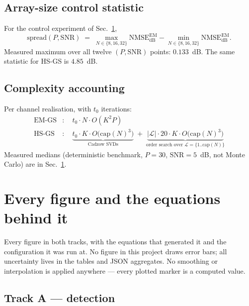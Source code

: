 \documentclass[11pt,a4paper]{article}
\newcommand{\NMSE}{\mathrm{NMSE}}
\newcommand{\SNR}{\mathrm{SNR}}
\newcommand{\dB}{\mathrm{dB}}
\begin{document}
\subsection{Array-size control statistic}
For the control experiment of Sec.~\ref{sec:figures},
\begin{equation}
\mathrm{spread}(P,\SNR) \;=\;
\max_{N\in\{8,16,32\}}\NMSE^{\mathrm{EM}}_{\dB}
-\min_{N\in\{8,16,32\}}\NMSE^{\mathrm{EM}}_{\dB} .
\label{eq:spread}
\end{equation}
Measured maximum over all twelve $(P,\SNR)$ points: $0.133$~dB. The same
statistic for HS-GS is $4.85$~dB.

\subsection{Complexity accounting}
Per channel realisation, with $t_0$ iterations:
\begin{align}
\text{EM-GS} &:\quad t_0\cdot N\cdot O(K^2P)
\label{eq:cplxem}\\
\text{HS-GS} &:\quad
  \underbrace{t_0\cdot K\cdot O\bigl(\mathrm{cap}(N)^3\bigr)}_{\text{Cadzow SVDs}}
  \;+\;
  \underbrace{|\mathcal{L}|\cdot 20\cdot K\cdot O\bigl(\mathrm{cap}(N)^3\bigr)}_{\text{order search over }\mathcal{L}=\{1..\mathrm{cap}(N)\}}
\label{eq:cplxhs}
\end{align}
Measured medians (deterministic benchmark, $P=30$, $\SNR=5$~dB, not Monte
Carlo) are in Sec.~\ref{sec:figures}.

\section{Every figure and the equations behind it}\label{sec:figures}

Every figure in both tracks, with the equations that generated it and the
configuration it was run at. No figure in this project draws error bars; all
uncertainty lives in the tables and JSON aggregates. No smoothing or
interpolation is applied anywhere --- every plotted marker is a computed
value.

\subsection{Track A --- detection}
\end{document}
